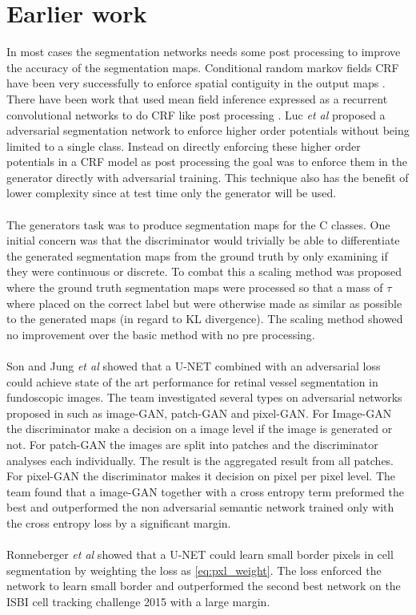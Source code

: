 \documentclass{kththesis}
\begin{document}
\section{Earlier work}
In most cases the segmentation networks needs some post processing to improve the accuracy of the segmentation maps. Conditional random markov fields CRF have been very successfully to enforce spatial contiguity in the output maps \parencite{arnab_higher_2015, luc_semantic_2016}. There have been work that used mean field inference expressed as a recurrent convolutional networks to do CRF like post processing \parencite{schwing_fully_2015, zheng_conditional_2015}. Luc \textit{et al} \parencite{luc_semantic_2016} proposed a adversarial segmentation network to enforce higher order potentials without being limited to a single class. Instead on directly enforcing these higher order potentials in a CRF model as post processing the goal was to enforce them in the generator directly with adversarial training. This technique also has the benefit of lower complexity since at test time only the generator will be used.\\
\\
The generators task was to produce segmentation maps for the C classes. One initial concern was that the discriminator would trivially be able to differentiate the generated segmentation maps from the ground truth by only examining if they were continuous or discrete. To combat this a scaling method was proposed where the ground truth segmentation maps were processed so that a mass of $\tau$ where placed on the correct label but were otherwise made as similar as possible to the generated maps (in regard to KL divergence). The scaling method showed no improvement over the basic method with no pre processing.\\
\\
Son and Jung \textit{et al} \parencite{son_retinal_2017} showed that a U-NET combined with an adversarial loss could achieve state of the art performance for retinal vessel segmentation in fundoscopic images. The team investigated several types on adversarial networks proposed in \parencite{isola_image--image_2016} such as image-GAN, patch-GAN and pixel-GAN. For Image-GAN the discriminator make a decision on a image level if the image is generated or not. For patch-GAN the images are split into patches and the discriminator analyses each individually. The result is the aggregated result from all patches. For pixel-GAN the discriminator makes it decision on pixel per pixel level. The team found that a image-GAN together with a cross entropy term preformed the best and outperformed the non adversarial semantic network trained only with the cross entropy loss by a significant margin.\\
\\
Ronneberger \textit{et al} \parencite{ronneberger_u-net:_2015} showed that a U-NET could learn small border pixels in cell segmentation by weighting the loss as \ref{eq:pxl_weight}. The loss enforced the network to learn small border and outperformed the second best network on the ISBI cell tracking challenge 2015 with a large margin.
\end{document}
